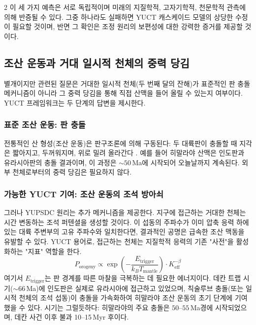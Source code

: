 \documentclass[12pt,a4paper]{article}
\begin{document}
\begin{multicols}{2}
		이 세 가지 예측은 서로 독립적이며 미래의 지질학적, 고자기학적, 천문학적 관측에 의해 반증될 수 있다. 그중 하나라도 실패하면 YUCT 캐스케이드 모델의 상당한 수정이 필요할 것이며, 반면 그 확인은 조정 원리의 보편성에 대한 강력한 증거를 제공할 것이다.
		
		\subsection{조산 운동과 거대 일시적 천체의 중력 당김}
		별개이지만 관련된 질문은 거대한 일시적 천체(두 번째 달의 잔해)가 표준적인 판 충돌 메커니즘이 아니라 그 중력 당김을 통해 직접 산맥을 들어 올릴 수 있는지 여부이다. YUCT 프레임워크는 두 단계의 답변을 제시한다.
		
		\subsubsection{표준 조산 운동: 판 충돌}
		전통적인 산 형성(조산 운동)은 판구조론에 의해 구동된다: 두 대륙판이 충돌할 때 지각은 짧아지고, 두꺼워지며, 위로 밀려 올라간다 \cite{Kearey2013}. 예를 들어 히말라야 산맥은 인도판과 유라시아판의 충돌 결과이며, 이 과정은 \(\sim 50\) Ma에 시작되어 오늘날까지 계속된다. 외부 천체로부터의 중력 당김은 필요하지 않다.
		
		\subsubsection{가능한 YUCT 기여: 조산 운동의 조석 방아쇠}
		그러나 YUPSDC 원리는 추가 메커니즘을 제공한다. 지구에 접근하는 거대한 천체는 시간 변동하는 조석 퍼텐셜을 생성할 것이다. 이 섭동의 주파수가 이미 압축 응력 하에 있는 대륙 주변부의 고유 주파수와 일치한다면, 결과적인 공명은 급속한 조산 맥동을 유발할 수 있다. YUCT 용어로, 접근하는 천체는 지질학적 응력의 기존 "사전"을 활성화하는 "지표" 역할을 한다.
		\begin{equation}
			P_{\text{orogeny}} \propto \exp\left(-\frac{E_{\text{trigger}}}{k_B T_{\text{mantle}}}\right) \cdot K_{\mathrm{eff}}^{-\beta}
		\end{equation}
		여기서 \(E_{\text{trigger}}\)는 판 경계를 따른 마찰을 극복하는 데 필요한 에너지이다. 데칸 트랩 시기(\(\sim 66\) Ma)에 인도판은 실제로 유라시아에 접근하고 있었으며, 칙술루브 충돌(또는 일시적 천체의 조석 섭동)이 충돌을 가속화하여 히말라야 조산 운동의 초기 단계에 기여했을 수 있다. 시기는 그럴듯하다: 히말라야의 주요 충돌은 \(50\)–\(55\) Ma경에 시작되었으며, 데칸 사건 이후 불과 10–15 Myr 후이다.
		

\end{multicols}
\end{document}
